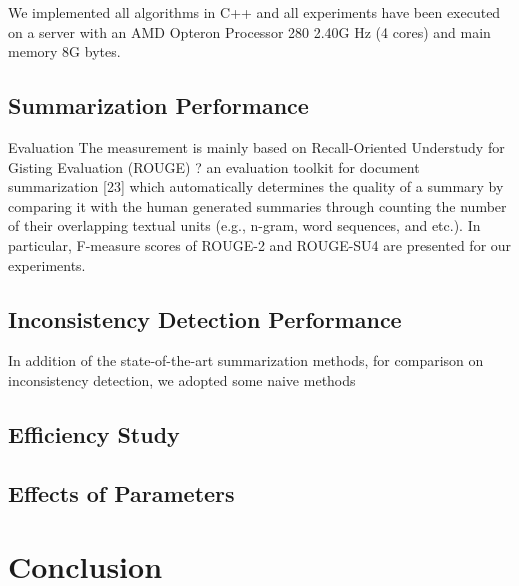 \documentclass{llncs}
\begin{document}
We implemented all algorithms in C++ and all experiments have been executed on a server
with an AMD Opteron Processor 280 2.40G Hz (4 cores)
and main memory 8G bytes.

\subsection{Summarization Performance}

Evaluation The measurement is mainly based on
Recall-Oriented Understudy for Gisting Evaluation
(ROUGE) ? an evaluation toolkit for document summarization
[23] which automatically determines the
quality of a summary by comparing it with the human
generated summaries through counting the number
of their overlapping textual units (e.g., n-gram, word
sequences, and etc.). In particular, F-measure scores
of ROUGE-2 and ROUGE-SU4 are presented for our
experiments.





\subsection{Inconsistency Detection Performance}
In addition of the state-of-the-art summarization methods, for comparison on inconsistency detection, we adopted some naive methods

\subsection{Efficiency Study}



\subsection{Effects of Parameters}



\section{Conclusion}\label{sec:conclusion}
\end{document}
